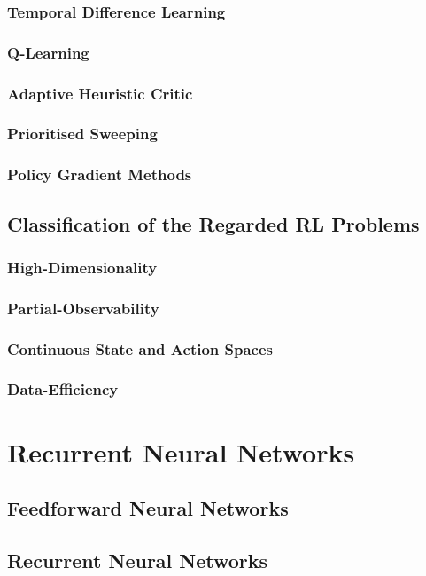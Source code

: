 \documentclass[officiallayout]{tktla}
\begin{document}
\subsection{Temporal Difference Learning}
\subsection{Q-Learning}
\subsection{Adaptive Heuristic Critic}
\subsection{Prioritised Sweeping}
\subsection{Policy Gradient Methods}

\section{Classification of the Regarded RL Problems}
\subsection{High-Dimensionality}
\subsection{Partial-Observability}
\subsection{Continuous State and Action Spaces}
\subsection{Data-Efficiency}

\chapter{Recurrent Neural Networks}
\section{Feedforward Neural Networks}
\section{Recurrent Neural Networks}
\end{document}
